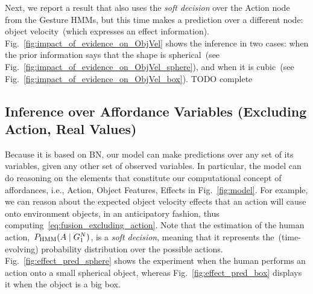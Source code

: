\begin{figure*}
\centering
{} \quad
%
\caption{Predictions about the object velocity of different objects, when given probabilistic soft evidence about the action.}
\label{fig:impact_of_evidence_on_ObjVel}
\end{figure*}

Next, we report a result that also uses the \emph{soft decision} over the Action node from the Gesture \acp{HMM}, but this time makes a prediction over a different node: object velocity~(which expresses an effect information).
Fig.~\ref{fig:impact_of_evidence_on_ObjVel} shows the inference in two cases: when the prior information says that the shape is spherical~(see Fig.~\ref{fig:impact_of_evidence_on_ObjVel_sphere}), and when it is cubic~(see Fig.~\ref{fig:impact_of_evidence_on_ObjVel_box}).
TODO complete

\subsection{Inference over Affordance Variables (Excluding Action, Real Values)}

Because it is based on \ac{BN}, our model can make predictions over any set of its variables, given any other set of observed variables.
In particular, the model can do reasoning on the elements that constitute our computational concept of affordances, i.e., Action, Object Features, Effects in Fig.~\ref{fig:model}.
For example, we can reason about the expected object velocity effects that an action will cause onto environment objects, in an anticipatory fashion, thus computing~\eqref{eq:fusion_excluding_action}.
Note that the estimation of the human action,~$P_{\text{HMM}}(A \mid G_1^N)$, is a \emph{soft decision}, meaning that it represents the~(time-evolving) probability distribution over the possible actions.
Fig.~\ref{fig:effect_pred_sphere} shows the experiment when the human performs an action onto a small spherical object, whereas Fig.~\ref{fig:effect_pred_box} displays it when the object is a big box.

